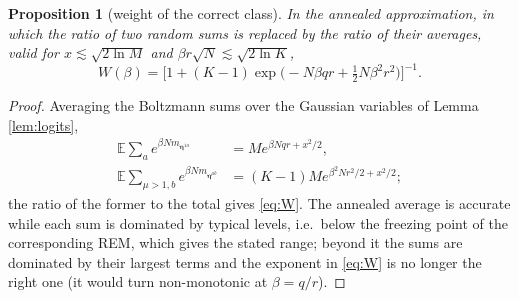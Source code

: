\documentclass{SciPost}
\theoremstyle{plain}
\newtheorem{proposition}{Proposition}
\theoremstyle{definition}
\newcommand{\e}{\bm{\eta}}
\newcommand{\E}{\mathbb{E}}
\begin{document}
\begin{proposition}[weight of the correct class]\label{prop:W}
In the annealed approximation, in which the ratio of two random sums is replaced by the ratio of their averages, valid for $x\lesssim\sqrt{2\ln M}$ and $\beta r\sqrt N\lesssim\sqrt{2\ln K}$,
\begin{equation}
W(\beta)=\Big[1+(K-1)\exp\!\big(-N\beta qr+\tfrac12N\beta^2r^2\big)\Big]^{-1}.
\label{eq:W}
\end{equation}
\end{proposition}
\begin{proof}
Averaging the Boltzmann sums over the Gaussian variables of Lemma \ref{lem:logits},
\begin{align*}
\E\sum_a e^{\beta Nm_{\e^{1a}}}&=Me^{\beta Nqr+x^2/2},\\
\E\sum_{\mu>1,b}e^{\beta Nm_{\e^{\mu b}}}&=(K-1)Me^{\beta^2Nr^2/2+x^2/2};
\end{align*}
the ratio of the former to the total gives \eqref{eq:W}. The annealed average is accurate while each sum is dominated by typical levels, i.e.\ below the freezing point of the corresponding REM, which gives the stated range; beyond it the sums are dominated by their largest terms and the exponent in \eqref{eq:W} is no longer the right one (it would turn non-monotonic at $\beta=q/r$).
\end{proof}
\end{document}
